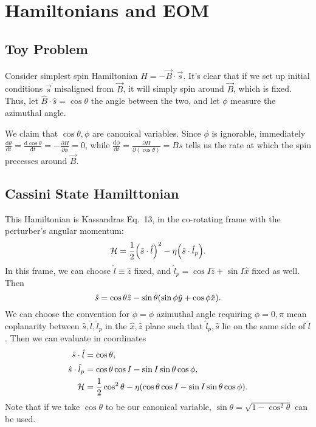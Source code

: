 \documentclass[11pt,
        usenames, %
        dvipsnames %
    ]{article}
\newcommand*{\rd}[2]{\frac{\mathrm{d}#1}{\mathrm{d}#2}}
\newcommand*{\pd}[2]{\frac{\partial#1}{\partial#2}}
\DeclarePairedDelimiter\p{\lparen}{\rparen}
\begin{document}
\def\Snospace~{\S{}} %
\renewcommand*{\sectionautorefname}{\Snospace}
\renewcommand*{\appendixautorefname}{\Snospace}
\renewcommand*{\figureautorefname}{Fig.}
\renewcommand*{\equationautorefname}{Eq.}
\renewcommand*{\tableautorefname}{Tab.}

\section{Hamiltonians and EOM}

\subsection{Toy Problem}

Consider simplest spin Hamiltonian $H = -\vec{B} \cdot \vec{s}$. It's clear that
if we set up initial conditions $\vec{s}$ misaligned from $\vec{B}$, it will
simply spin around $\vec{B}$, which is fixed. Thus, let $\hat{B} \cdot \hat{s} =
\cos \theta$ the angle between the two, and let $\phi$ measure the azimuthal
angle.

We claim that $\cos \theta, \phi$ are canonical variables. Since $\phi$ is
ignorable, immediately $\rd{\theta}{t} = \rd{\cos \theta}{t} = -\pd{H}{\phi} =
0$, while $\rd{\phi}{t} = \pd{H}{(\cos \theta)} = Bs$ tells us the rate at which
the spin precesses around $\vec{B}$.

\subsection{Cassini State Hamilttonian}

This Hamiltonian is Kassandras Eq.\ 13, in the co-rotating frame with the
perturber's angular momentum:
\begin{equation}
    \mathcal{H} = \frac{1}{2}\p*{\hat{s} \cdot \hat{l}}^2
        - \eta \p*{\hat{s} \cdot \hat{l}_p}.
\end{equation}
In this frame, we can choose $\hat{l} \equiv \hat{z}$ fixed, and $\hat{l}_p =
\cos I\hat{z} + \sin I\hat{x}$ fixed as well. Then
\begin{equation*}
    \hat{s} = \cos\theta \hat{z}
        - \sin\theta\p*{\sin \phi \hat{y} + \cos \phi \hat{x}}.
\end{equation*}
We can choose the convention for $\phi = \phi$ azimuthal angle requiring $\phi =
0, \pi$ mean coplanarity between $\hat{s}, \hat{l}, \hat{l}_p$ in the $\hat{x},
\hat{z}$ plane such that $\hat{l}_p, \hat{s}$ lie on the same side of
$\hat{l}$. Then we can evaluate in coordinates
\begin{align*}
    \hat{s} \cdot \hat{l} &= \cos \theta,\\
    \hat{s} \cdot \hat{l}_p
        &= \cos \theta \cos I - \sin I \sin \theta \cos \phi,\\
    \mathcal{H} &= \frac{1}{2}\cos^2\theta
        - \eta \p*{\cos \theta \cos I - \sin I \sin \theta \cos \phi}.
\end{align*}
Note that if we take $\cos\theta$ to be our canonical variable, $\sin\theta =
\sqrt{1 - \cos^2\theta}$ can be used.
\end{document}
